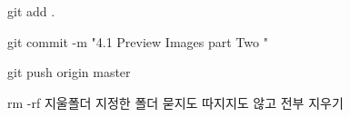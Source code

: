 git add .

git commit -m "4.1 Preview Images part Two "

git push origin master

rm -rf 지울폴더
지정한 폴더 묻지도 따지지도 않고 전부 지우기
